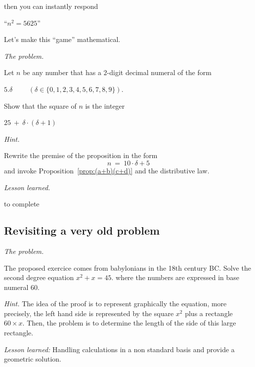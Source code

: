 \noindent
then you can instantly respond

\hspace{.25in}``$n^2 = 5625$''

\noindent
Let's make this ``game'' mathematical.
\medskip


\noindent \textit{The problem.}

Let $n$ be any number that has a $2$-digit decimal numeral of the form

\hspace{.25in}$5.\delta$ \ \ \ \ $(\delta \in \{ 0,1,2,3,4,5,6,7,8,9\})$.

\noindent
Show that the square of $n$ is the integer

\hspace{.25in}$25 \ + \ \delta \cdot (\delta +1)$
\medskip

\noindent \textit{Hint.}

Rewrite the premise of the proposition in the form
\[ n \ = \ 10 \cdot \delta + 5 \]
and invoke Proposition~\ref{prop:(a+b)(c+d)} and the
distributive law.
\medskip

\noindent \textit{Lesson learned.}

{\Denis to complete}


\subsection{Revisiting a very old problem}

\noindent \textit{The problem.}

The proposed exercice comes from babylonians in the 18th century BC.
Solve the second degree equation $x^2 + x = 45$. where the numbers are expressed in base numeral $60$. 
\medskip

\noindent \textit{Hint.}
The idea of the proof is to represent graphically the equation,
more precisely, the left hand side is represented by the square $x^2$ plus a rectangle $60 \times x$.
Then, the problem is to determine the length of the side of this large rectangle.
\medskip

\noindent \textit{Lesson learned:}
Handling calculations in a non standard basis and provide a geometric solution. 

